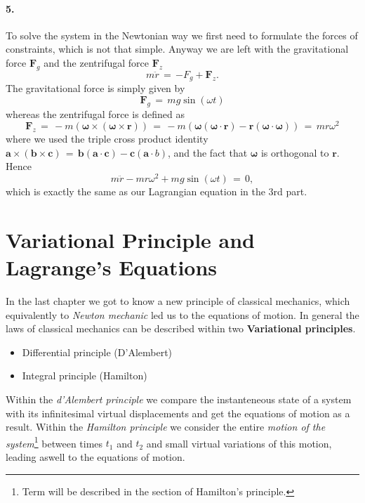 \documentclass{report}
\renewcommand{\vec}[1]{\mathbf{#1}}
\begin{document}
\subsubsection{5.}
To solve the system in the Newtonian way we first need to formulate the forces
of constraints, which is not that simple. Anyway we are left with the
gravitational force $\vec F_g$ and the zentrifugal force $\vec F_z$
\begin{equation*}
  m \ddot r \,=\, \vec -F_g + \vec F_z.
\end{equation*}
The gravitational force is simply given by
\begin{equation*}
  \vec F_g \,=\, m g \sin(\omega t) 
\end{equation*}
whereas the zentrifugal force is defined as
\begin{equation*}
  \vec F_z \,=\, - m ( \vec \omega \times ( \vec \omega \times \vec r ) ) \,=\, -
m( \vec \omega (\vec \omega \cdot \vec r) - \vec r (\vec \omega \cdot \vec
\omega)) \,=\, m r \omega^2 
\end{equation*}
where we used the triple cross product identity $\vec a \times ( \vec b \times
\vec c) \,=\, \vec b (\vec a \cdot \vec c) - \vec c( \vec a \cdot b )$, and the
fact that $\vec \omega$ is orthogonal to $\vec r$. Hence 
\begin{equation*}
  m \ddot r - m r \omega^2 + m g\sin(\omega t) \,=\, 0,
\end{equation*}
which is exactly the same as our Lagrangian equation in the 3rd part.
  

\chapter{Variational Principle and Lagrange's Equations}
In the last chapter we got to know a new principle of classical mechanics,
which equivalently to \textit{Newton mechanic} led us to the equations of
motion. In general the laws of classical mechanics can be described within two
\textbf{Variational principles}.
\begin{itemize}
  \item Differential principle (D'Alembert)
  \item Integral principle (Hamilton)
\end{itemize}
Within the \textit{d'Alembert principle} we compare the instanteneous state of
a system with its infinitesimal virtual displacements and get the equations of
motion as a result. Within the \textit{Hamilton principle} we consider the 
entire \textit{motion of the system}\footnote{Term will be described in the
section of Hamilton's principle.} between times $t_1$ and $t_2$ and small virtual 
variations of this motion, leading aswell to the equations of motion. 
\end{document}
